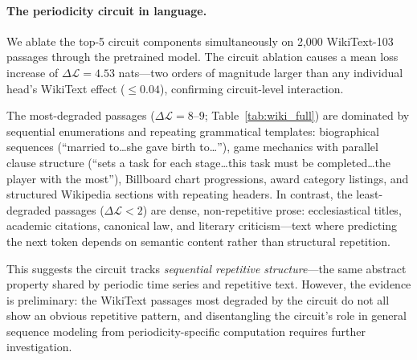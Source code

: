\documentclass{article}
\begin{document}
\paragraph{The periodicity circuit in language.}
We ablate the top-5 circuit components simultaneously on 2{,}000 WikiText-103 passages through the pretrained model. The circuit ablation causes a mean loss increase of $\Delta\mathcal{L} = 4.53$ nats---two orders of magnitude larger than any individual head's WikiText effect ($\leq 0.04$), confirming circuit-level interaction.

The most-degraded passages ($\Delta\mathcal{L} = 8$--$9$; Table~\ref{tab:wiki_full}) are dominated by sequential enumerations and repeating grammatical templates: biographical sequences (``married to\ldots she gave birth to\ldots''), game mechanics with parallel clause structure (``sets a task for each stage\ldots this task must be completed\ldots the player with the most''), Billboard chart progressions, award category listings, and structured Wikipedia sections with repeating headers. In contrast, the least-degraded passages ($\Delta\mathcal{L} < 2$) are dense, non-repetitive prose: ecclesiastical titles, academic citations, canonical law, and literary criticism---text where predicting the next token depends on semantic content rather than structural repetition.

This suggests the circuit tracks \emph{sequential repetitive structure}---the same abstract property shared by periodic time series and repetitive text. However, the evidence is preliminary: the WikiText passages most degraded by the circuit do not all show an obvious repetitive pattern, and disentangling the circuit's role in general sequence modeling from periodicity-specific computation requires further investigation.
\end{document}
